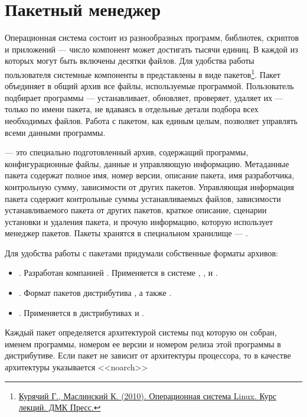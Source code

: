 \chapter{Пакетный менеджер}\label{package-manager}
Операционная система состоит из разнообразных программ, библиотек, скриптов и приложений --- 
число компонент может достигать тысячи единиц. В каждой из которых могут быть включены десятки файлов. 
Для удобства работы пользователя системные компоненты в  представлены в виде 
пакетов\footnote{\href{https://docs.altlinux.org/books/altlibrary-linuxintro2.pdf}{Курячий Г., Маслинский К. (2010). 
Операционная система Linux. Курс лекций. ДМК Пресс.}}. Пакет объединяет в общий архив все файлы, 
используемые программой. Пользователь подбирает программы --- устанавливает, обновляет, проверяет, 
удаляет их --- только по имени пакета, не вдаваясь в отдельные детали подбора всех необходимых файлов. 
Работа с пакетом, как единым целым, позволяет управлять всеми данными программы.

 --- это специально подготовленный архив, содержащий программы, конфигурационные файлы, 
данные и управляющую информацию. Метаданные пакета содержат полное имя, номер версии, описание пакета, 
имя разработчика, контрольную сумму, зависимости от других пакетов. Управляющая информация пакета содержит 
контрольные суммы устанавливаемых файлов, зависимости устанавливаемого пакета от других пакетов, 
краткое описание, сценарии установки и удаления пакета, и прочую информацию, которую использует 
менеджер пакетов. Пакеты хранятся в специальном хранилище --- .

Для удобства работы с пакетами придумали собственные форматы архивов:

\begin{itemize}
	\item {}. Разработан компанией . Применяется в системе , ,  и .
	\item {}. Формат пакетов дистрибутива , а также .
	\item {}. Применяется в дистрибутивах  и .
\end{itemize}

Каждый пакет определяется архитектурой системы под которую он собран, именем программы, 
номером ее версии и номером релиза этой программы в дистрибутиве. Если пакет не зависит 
от архитектуры процессора, то в качестве архитектуры указывается <<noarch>>

